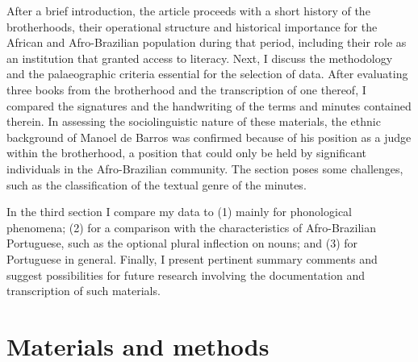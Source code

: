 \documentclass[output=paper,colorlinks,citecolor=brown]{langscibook}
\begin{document}
After a brief introduction, the article proceeds with a short history of the brotherhoods, their operational structure and historical importance for the African and Afro-Brazilian population during that period, including their role as an institution that granted access to literacy. Next, I discuss the methodology and the palaeographic criteria essential for the selection of data. After evaluating three books from the brotherhood and the transcription of one thereof, I compared the signatures and the handwriting of the terms and minutes contained therein. In assessing the sociolinguistic nature of these materials, the ethnic background of Manoel de Barros was confirmed because of his position as a judge within the brotherhood, a position that could only be held by significant individuals in the Afro-Brazilian community. The section poses some challenges, such as the classification of the textual genre of the minutes.

In the third section I compare my data to
(1) \citet{Oliveira_2006} mainly for phonological phenomena;
(2) \citet{Lucchesi_Baxter_Ribeiro_2009} for a comparison with the characteristics of Afro-Brazilian Portuguese, such as the optional plural inflection on nouns; and
(3) \citet{Petter_2009} for Portuguese in general. Finally, I present pertinent summary comments and suggest possibilities for future research involving the documentation and transcription of such materials.

\section{Materials and methods}
\end{document}
